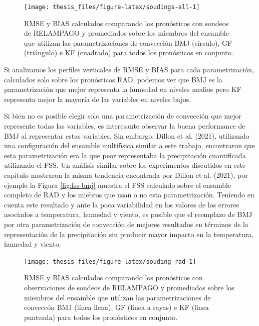 \documentclass[12pt,oneside]{reedthesis}
\begin{document}
\begin{figure}

{\centering \texttt{[image: thesis\_files/figure-latex/soudings-all-1]} 

}

\caption{RMSE y BIAS calculados comparando los pronósticos con sondeos de RELAMPAGO y promediados sobre los miembros del ensamble que utilizan las parametrizaciones de convección BMJ (círculo), GF (triángulo) e KF (cuadrado) para todos los pronósticos en conjunto.}\label{fig:soudings-all}
\end{figure}
Si analizamos los perfiles verticales de RMSE y BIAS para cada parametrización, calculados solo sobre los pronósticos RAD, podemos ver que BMJ es la parametrización que mejor representa la humedad en niveles medios pero KF representa mejor la mayoría de las variables en niveles bajos.

Si bien no es posible elegir solo una parametrización de convección que mejor represente todas las variables, es interesante observar la buena performance de BMJ al representar estas variables. Sin embargo, Dillon et al. (2021), utilizando una configuración del ensamble multifísica similar a este trabajo, encontraron que esta parametrización era la que peor representaba la precipitación cuantificada utilizando el FSS. Un análisis similar sobre los experimentos discutidos en este capítulo mostraron la misma tendencia encontrada por Dillon et al. (2021), por ejemplo la Figura \ref{fig:fss-bmj} muestra el FSS calculado sobre el ensamble completo de RAD y los miebros que usan o no esta parametrización. Teniendo en cuenta este resultado y ante la poca variabilidad en los valores de los errores asociados a temperatura, humedad y viento, es posible que el reemplazo de BMJ por otra parametrización de convección de mejores resultados en términos de la representación de la precipitación sin producir mayor impacto en la temperatura, humedad y viento.


\begin{figure}

{\centering \texttt{[image: thesis\_files/figure-latex/souding-rad-1]} 

}

\caption{RMSE y BIAS calculados comparando los pronósticos con observaciones de sondeos de RELAMPAGO y promediados sobre los miembros del ensamble que utilizan las parametrizaciones de conveccón BMJ (línea llena), GF (línea a rayas) e KF (línea punteada) para todos los pronósticos en conjunto.}\label{fig:souding-rad}
\end{figure}
\end{document}
